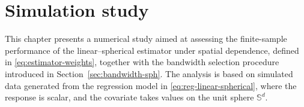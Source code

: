 \documentclass[12pt]{report} %
\newcommand{\Sd}{\mathbb{S}^{d}}
\begin{document}



\chapter{Simulation study} \label{ch:simulation}

This chapter presents a numerical study aimed at assessing the finite-sample performance of the linear--spherical estimator under spatial dependence, defined in \eqref{eq:estimator-weights}, together with the bandwidth selection procedure introduced in Section~\ref{sec:bandwidth-sph}. The analysis is based on simulated data generated from the regression model in \eqref{eq:reg-linear-spherical}, where the response is scalar, and the covariate takes values on the unit sphere $\Sd$. 
\end{document}
